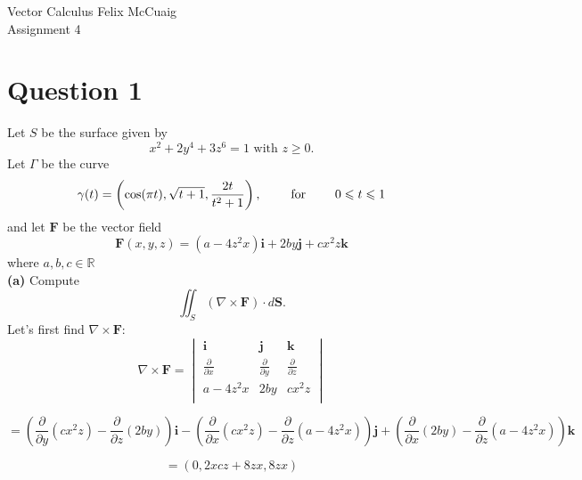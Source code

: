 \documentclass[12pt]{article}
\newcommand{\vect}[1]{\boldsymbol{#1}}
\begin{document}
Vector Calculus \hfill Felix McCuaig \\
Assignment 4

\section*{Question 1}
Let $S$ be the surface given by
$$
x^2+2y^4+3z^6=1 \text{ with } z \geqslant 0.
$$
Let $\Gamma$ be the curve
$$
\gamma (t)= \left( \cos(\pi t) , \sqrt{t+1}, \frac{2t}{t^2+1} \right), \hspace{20px} \text{ for } \hspace{20px}  0 \leqslant t \leqslant 1
$$
and let $\vect{F}$ be the vector field 
$$
\vect{F}(x,y,z)=(a-4z^2x)\vect{i}+2by\vect{j}+cx^2z\vect{k}
$$
where $a,b,c \in \mathbb{R}$\\
\medskip
\textbf{(a)} Compute
$$
\iint_{S}(\nabla \times \vect{F})\cdot d \vect{S}.
$$
Let's first find $\nabla \times \vect{F}$:
\smallskip
$$
\nabla \times \vect{F} = 
\begin{vmatrix}
	\vect{i}  & \vect{j} & \vect{k} \\
	\frac{\partial}{\partial x}  & \frac{\partial}{\partial y} & \frac{\partial}{\partial z} \\
	a-4z^2x  & 2by & cx^2z \\
\end{vmatrix}
$$

$$
=\left( \frac{\partial}{\partial y}(cx^2z)-\frac{\partial}{\partial z}(2by) \right)\vect{i}-
\left( \frac{\partial}{\partial x}(cx^2z)-\frac{\partial}{\partial z}(a-4z^2x) \right)\vect{j}+
\left( \frac{\partial}{\partial x}(2by)-\frac{\partial}{\partial z}(a-4z^2x) \right)\vect{k}
$$

$$
=(0,  2xcz+8zx,  8zx)
$$
\end{document}
